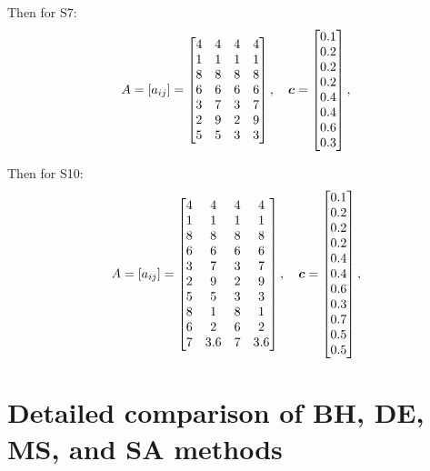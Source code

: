Then for S7:
$$
A=[a_{ij}] = \begin{bmatrix}
4 & 4 & 4 & 4 \\
1 & 1 & 1 & 1 \\
8 & 8 & 8 & 8 \\
6 & 6 & 6 & 6 \\
3 & 7 & 3 & 7 \\
2 & 9 & 2 & 9 \\
5 & 5 & 3 & 3 \\
\end{bmatrix},
\quad
\boldsymbol{c} = \begin{bmatrix} 0.1 \\ 0.2 \\ 0.2 \\ 0.2 \\ 0.4 \\ 0.4 \\ 0.6 \\ 0.3 \end{bmatrix},
$$

Then for S10:
$$
A=[a_{ij}] = \begin{bmatrix}
4 & 4 & 4 & 4 \\
1 & 1 & 1 & 1 \\
8 & 8 & 8 & 8 \\
6 & 6 & 6 & 6 \\
3 & 7 & 3 & 7 \\
2 & 9 & 2 & 9 \\
5 & 5 & 3 & 3 \\
8 & 1 & 8 & 1 \\
6 & 2 & 6 & 2 \\
7 & 3.6 & 7 & 3.6
\end{bmatrix},
\quad
\boldsymbol{c} = \begin{bmatrix} 0.1 \\ 0.2 \\ 0.2 \\ 0.2 \\ 0.4 \\ 0.4 \\ 0.6 \\ 0.3 \\ 0.7 \\ 0.5 \\ 0.5 \end{bmatrix},
$$
\clearpage

\section{Detailed comparison of BH, DE, MS, and SA methods}

